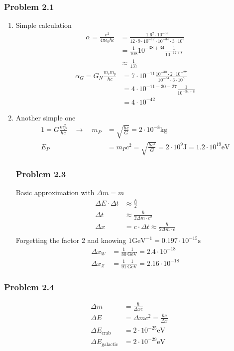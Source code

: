 \documentclass[10pt,a4paper]{article}
\theoremstyle{definition}
\begin{document}
\subsubsection{Problem 2.1}
\begin{enumerate}
\item Simple calculation
\begin{align}
\alpha=\frac{e^2}{4\pi\epsilon_0\hbar c}&=\frac{1.6^2\cdot 10^{-38}}{12\cdot 9\cdot 10^{-12}\cdot 10^{-34}\cdot3\cdot10^8}\\
&=\frac{1}{108}10^{-38+34}\frac{1}{10^{-12+8}}\\
&\approx\frac{1}{137}
\end{align}
\begin{align}
\alpha_G=G_N\frac{m_em_p}{\hbar c}&=7\cdot10^{-11}\frac{10^{-30}\cdot2\cdot10^{-27}}{10^{-34}\cdot3\cdot10^8}\\
&=4\cdot10^{-11-30-27}\frac{1}{10^{-34+8}}\\
&=4\cdot10^{-42}
\end{align}
\item Another simple one
\begin{align}
1=G\frac{m_P^2}{\hbar c}\quad\rightarrow\quad m_P&=\sqrt{\frac{\hbar c}{G}}=2\cdot10^{-8}\text{kg}\\
E_P&=m_Pc^2=\sqrt{\frac{\hbar c^5}{G}}=2\cdot10^9\text{J}=1.2\cdot10^{19}\text{eV}
\end{align}

\subsubsection{Problem 2.3}
Basic approximation with $\Delta m = m$
\begin{align}
\Delta E\cdot\Delta t&\approx\frac{\hbar}{2}\\
\Delta t&\approx\frac{\hbar}{2\Delta m\cdot c^2}\\
\Delta x&=c\cdot\Delta t\approx\frac{\hbar}{2\Delta m\cdot c}\\
\end{align}
Forgetting the factor 2 and knowing $1\text{GeV}^{-1}= 0.197\cdot10^{-15}\text{s}$
\begin{align}
\Delta x_W&=\frac{1}{80}\frac{1}{\text{GeV}}=2.4\cdot10^{-18}\\
\Delta x_Z&=\frac{1}{91}\frac{1}{\text{GeV}}=2.16\cdot10^{-18}
\end{align}
\end{enumerate}

\subsubsection{Problem 2.4}
\begin{align}
\Delta m &= \frac{\hbar}{\Delta x c}\\
\Delta E &= \Delta m c^2=\frac{\hbar c}{\Delta x}\\
\Delta E_\text{crab}&=2\cdot10^{-25}\text{eV}\\
\Delta E_\text{galactic}&=2\cdot10^{-29}\text{eV}
\end{align}
\end{document}
